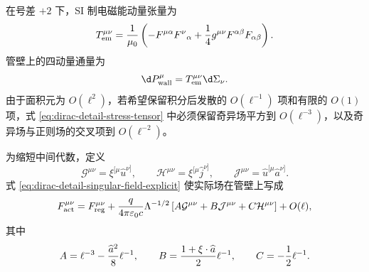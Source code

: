在号差 $+2$ 下，SI 制电磁能动量张量为
\begin{equation}
 T_{\mathrm{em}}^{\mu\nu}
 ={1\over\mu_0}
 \left(
 -F^{\mu\alpha}F^\nu{}_{\alpha}
 +{1\over4}g^{\mu\nu}F^{\alpha\beta}F_{\alpha\beta}
 \right).
 \label{eq:dirac-detail-stress-tensor}
\end{equation}
管壁上的四动量通量为
\begin{equation}
 \d P_{\mathrm{wall}}^\mu
 =T_{\mathrm{em}}^{\mu\nu}\d\Sigma_\nu.
 \label{eq:dirac-detail-wall-flux-definition}
\end{equation}
由于面积元为 $O(\ell^2)$，若希望保留积分后发散的 $O(\ell^{-1})$ 项和有限的 $O(1)$ 项，式 \eqref{eq:dirac-detail-stress-tensor} 中必须保留奇异场平方到 $O(\ell^{-3})$，以及奇异场与正则场的交叉项到 $O(\ell^{-2})$。

为缩短中间代数，定义
\begin{equation*}
 \mathcal G^{\mu\nu}=\xi^{[\mu}\widehat u^{\nu]},
 \qquad
 \mathcal H^{\mu\nu}=\xi^{[\mu}\widehat j^{\nu]},
 \qquad
 \mathcal J^{\mu\nu}=\widehat u^{[\mu}\widehat a^{\nu]}.
\end{equation*}
式 \eqref{eq:dirac-detail-singular-field-explicit} 使实际场在管壁上写成
\begin{equation}
 F_{\mathrm{act}}^{\mu\nu}
 =F_{\mathrm{reg}}^{\mu\nu}
 +{q\over4\pi\varepsilon_0c}\Lambda^{-1/2}
 \left[
 A\mathcal G^{\mu\nu}
 +B\mathcal J^{\mu\nu}
 +C\mathcal H^{\mu\nu}
 \right]+O(\ell),
 \label{eq:dirac-detail-field-ABC}
\end{equation}
其中
\begin{equation}
 A=\ell^{-3}-{\widehat a^2\over8}\ell^{-1},
 \qquad
 B={1+\xi\cdot \widehat a\over2}\ell^{-1},
 \qquad
 C=-{1\over2}\ell^{-1}.
 \label{eq:dirac-detail-ABC-coefficients}
\end{equation}

